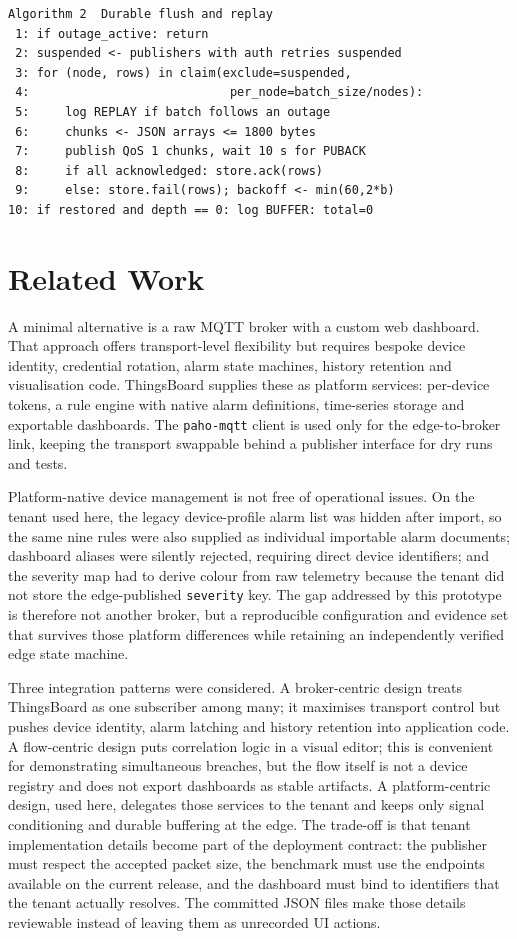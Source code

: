 \documentclass[conference]{IEEEtran}
\begin{document}
{\scriptsize
\begin{verbatim}
Algorithm 2  Durable flush and replay
 1: if outage_active: return
 2: suspended <- publishers with auth retries suspended
 3: for (node, rows) in claim(exclude=suspended,
 4:                            per_node=batch_size/nodes):
 5:     log REPLAY if batch follows an outage
 6:     chunks <- JSON arrays <= 1800 bytes
 7:     publish QoS 1 chunks, wait 10 s for PUBACK
 8:     if all acknowledged: store.ack(rows)
 9:     else: store.fail(rows); backoff <- min(60,2*b)
10: if restored and depth == 0: log BUFFER: total=0
\end{verbatim}
}

\section{Related Work}
\label{sec:related}

A minimal alternative is a raw MQTT broker with a custom web dashboard. That
approach offers transport-level flexibility but requires bespoke device
identity, credential rotation, alarm state machines, history retention and
visualisation code. ThingsBoard \cite{TB} supplies these as platform services:
per-device tokens, a rule engine with native alarm definitions, time-series
storage and exportable dashboards. The \texttt{paho-mqtt} client \cite{Paho} is
used only for the edge-to-broker link, keeping the transport swappable behind a
publisher interface for dry runs and tests.

Platform-native device management is not free of operational issues. On the
tenant used here, the legacy device-profile alarm list was hidden after import,
so the same nine rules were also supplied as individual importable alarm
documents; dashboard aliases were silently rejected, requiring direct device
identifiers; and the severity map had to derive colour from raw telemetry
because the tenant did not store the edge-published \texttt{severity} key. The
gap addressed by this prototype is therefore not another broker, but a
reproducible configuration and evidence set that survives those platform
differences while retaining an independently verified edge state machine.

Three integration patterns were considered. A broker-centric design treats
ThingsBoard as one subscriber among many; it maximises transport control but
pushes device identity, alarm latching and history retention into application
code. A flow-centric design puts correlation logic in a visual editor; this
is convenient for demonstrating simultaneous breaches, but the flow itself is
not a device registry and does not export dashboards as stable artifacts. A
platform-centric design, used here, delegates those services to the tenant and
keeps only signal conditioning and durable buffering at the edge. The trade-off
is that tenant implementation details become part of the deployment
contract: the publisher must respect the accepted packet size, the benchmark
must use the endpoints available on the current release, and the dashboard
must bind to identifiers that the tenant actually resolves. The committed
JSON files make those details reviewable instead of leaving them as
unrecorded UI actions.
\end{document}
